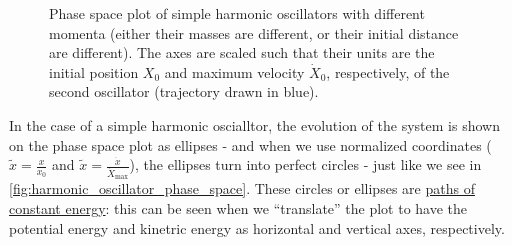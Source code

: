 \begin{figure}
  \centering
  \caption{Phase space plot of simple harmonic oscillators with different momenta (either their masses are different, or their initial distance are different). The axes are scaled such that their units are the initial position $X_{0}$ and maximum velocity $\dot{X}_{0}$, respectively, of the second oscillator (trajectory drawn in blue).}
  \label{fig:harmonic_oscillator_phase_space}
\end{figure}

In the case of a simple harmonic oscialltor, the evolution of the system is shown on the phase space plot as ellipses - and when we use normalized coordinates ($\tilde{x}=\frac{x}{x_{0}}$ and $\tilde{x}=\frac{\dot{x}}{\dot{X}_{\max}}$), the ellipses turn into perfect circles - just like we see in \autoref{fig:harmonic_oscillator_phase_space}. These circles or ellipses are \underline{paths of constant energy}: this can be seen when we \enquote{translate} the plot to have the potential energy and kinetric energy as horizontal and vertical axes, respectively.

